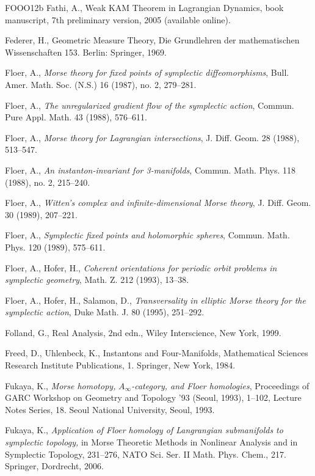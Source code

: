 \begin{thebibliography}{FOOO12b}
 Fathi, A., Weak KAM Theorem in Lagrangian Dynamics, book manuscript, 7th preliminary
  version, 2005 (available online).

 Federer, H., Geometric Measure Theory, Die Grundlehren der mathema\-tischen
  Wissenschaften 153. Berlin: Springer, 1969.

 Floer, A., \emph{Morse theory for fixed points of symplectic diﬀeomorphisms}, Bull.
  Amer. Math. Soc. (N.S.) 16 (1987), no. 2, 279–281.

 Floer, A., \emph{The unregularized gradient flow of the symplectic action},
  Commun. Pure Appl. Math. 43 (1988), 576–611.

 Floer, A., \emph{Morse theory for Lagrangian intersections}, J. Diﬀ. Geom. 28
  (1988), 513–547.

 Floer, A., \emph{An instanton-invariant for 3-manifolds}, Commun. Math. Phys. 118
  (1988), no. 2, 215–240.

 Floer, A., \emph{Witten’s complex and infinite-dimensional Morse theory}, J. Diﬀ.
  Geom. 30 (1989), 207–221.

 Floer, A., \emph{Symplectic fixed points and holomorphic spheres}, Commun. Math.
  Phys. 120 (1989), 575–611.

 Floer, A., Hofer, H., \emph{Coherent orientations for periodic orbit problems in
  symplectic geometry}, Math. Z. 212 (1993), 13–38.

 Floer, A., Hofer, H., Salamon, D., \emph{Transversality in elliptic Morse theory
  for the symplectic action}, Duke Math. J. 80 (1995), 251–292.

 Folland, G., Real Analysis, 2nd edn., Wiley Interscience, New York, 1999.

 Freed, D., Uhlenbeck, K., Instantons and Four-Manifolds, Mathematical Sciences
  Research Institute Publications, 1. Springer, New York, 1984.

 Fukaya, K., \emph{Morse homotopy, }$A_\infty$\emph{-category, and Floer homologies},
  Proceedings of GARC Workshop on Geometry and Topology ’93 (Seoul, 1993), 1–102, Lecture Notes Series,
  18. Seoul National University, Seoul, 1993.

 Fukaya, K., \emph{Application of Floer homology of Langrangian submanifolds to
  symplectic topology,} in Morse Theoretic Methods in Nonlinear Analy\-sis and in Symplectic Topology,
  231–276, NATO Sci. Ser. II Math. Phys. Chem., 217. Springer, Dordrecht, 2006.


\end{thebibliography}
